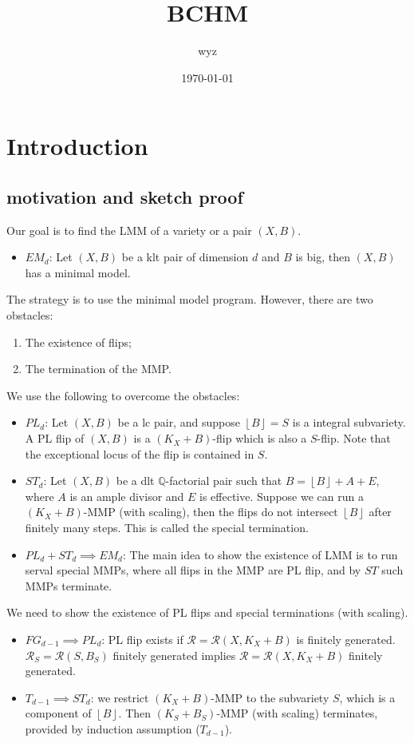 \documentclass{article}
\title{BCHM}
\author{wyz}
\date{\today}
\begin{document}
\maketitle
\section{Introduction}
\subsection{motivation and sketch proof}
Our goal is to find the LMM of a variety or a pair $(X,B)$. 
\begin{itemize}
  \item $EM_{d}$: Let $(X,B)$ be a klt pair of dimension $d$ and $B$ is big, then $(X,B)$ has a minimal model.
\end{itemize}

The strategy is to use the minimal model program. However, there are two obstacles:
\begin{enumerate}
  \item The existence of flips;
  \item The termination of the MMP.
\end{enumerate}
We use the following to overcome the obstacles:
\begin{itemize}
  \item $PL_{d}$: Let $(X,B)$ be a lc pair, and suppose $\left\lfloor B \right\rfloor = S$ is a integral subvariety. A PL flip of $(X,B)$ is a $(K_{X}+B)$-flip which is also a $S$-flip. Note that the exceptional locus of the flip is contained in $S$.  
  \item $ST_{d}$: Let $(X,B)$ be a dlt $\mathbb{Q}$-factorial pair such that $B=\left\lfloor B \right\rfloor +A+E$, where $A$ is an ample divisor and $E$ is effective. Suppose we can run a $(K_{X}+B)$-MMP (with scaling), then the flips do not intersect $\left\lfloor B \right\rfloor$ after finitely many steps. This is called the special termination. 
  \item $PL_{d} + ST_{d}\implies EM_{d} $: The main idea to show the existence of LMM is to run serval special MMPs, where all flips in the MMP are PL flip, and by $ST$ such MMPs terminate.
\end{itemize}
We need to show the existence of PL flips and special terminations (with scaling). 
\begin{itemize}
  \item $FG_{d-1}\implies PL_{d}$: PL flip exists if $\mathcal{R}=\mathcal{R}(X,K_{X}+B)$ is finitely generated. $\mathcal{R}_{S}=\mathcal{R}(S,B_{S})$ finitely generated implies $\mathcal{R}=\mathcal{R}(X,K_{X}+B)$ finitely generated.
  \item $T_{d-1}\implies ST_{d}$: we restrict $(K_{X}+B)$-MMP to the subvariety $S$, which is a component of $\left\lfloor B \right\rfloor$. Then $(K_{S}+B_{S})$-MMP (with scaling) terminates, provided by induction assumption ($T_{d-1}$). 
\end{itemize}
\end{document}
